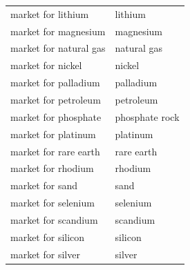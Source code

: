 \documentclass{article}
\begin{document}
\begin{longtable}{ll}
    market for lithium         & lithium                                                                                           \\
    market for magnesium       & magnesium                                                                                         \\
    market for natural gas     & natural gas                                                                                       \\
    market for nickel          & nickel                                                                                            \\
    market for palladium       & palladium                                                                                         \\
    market for petroleum       & petroleum                                                                                         \\
    market for phosphate       & phosphate rock                                                                                    \\
    market for platinum        & platinum                                                                                          \\
    market for rare earth      & rare earth                                                                                        \\
    market for rhodium         & rhodium                                                                                           \\
    market for sand            & sand                                                                                              \\
    market for selenium        & selenium                                                                                          \\
    market for scandium        & scandium                                                                                          \\
    market for silicon         & silicon                                                                                           \\
    market for silver          & silver                                                                                            \\

\end{longtable}
\end{document}
